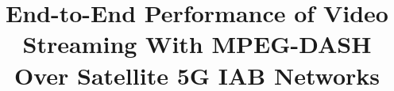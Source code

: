 \documentclass[journal]{IEEEtran}
\begin{document}
%
\title{End-to-End Performance of Video Streaming With MPEG-DASH Over Satellite 5G IAB Networks}
%
%
%


% 
%
\end{document}
